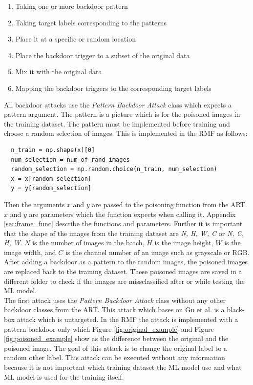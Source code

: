 \begin{enumerate}
  \item Taking one or more backdoor pattern
  \item Taking target labels corresponding to the patterns
  \item Place it at a specific or random location
  \item Place the backdoor trigger to a subset of the original data
  \item Mix it with the original data
  \item Mapping the backdoor triggers to the corresponding target labels
\end{enumerate}

All backdoor attacks use the \textit{Pattern Backdoor Attack} \cite{DBLP:journals/corr/abs-1708-06733} class which expects a pattern argument. The pattern is a picture which is for the poisoned images in the training dataset. The pattern must be implemented before training and choose a random selection of images. This is implemented in the RMF as follows:

\begin{lstlisting}
  n_train = np.shape(x)[0]
  num_selection = num_of_rand_images
  random_selection = np.random.choice(n_train, num_selection)
  x = x[random_selection]
  y = y[random_selection]
\end{lstlisting}

Then the arguments $x$ and $y$ are passed to the poisoning function from the ART. $x$ and $y$ are parameters which the function expects when calling it. Appendix \ref{sec:frame_func}
describe the functions and parameters. Further it is important that the shape of the images from the training dataset are \textit{N, H, W, C} or \textit{N, C, H, W}. $N$ is the number of
images in the batch, $H$ is the image height, $W$ is the image width, and $C$ is the channel number of an image such as grayscale or RGB. After adding a backdoor as a pattern to the
random images, the poisoned images are replaced back to the training dataset. These poisoned images are saved in a different folder to check if the images are missclassified after or while
testing the ML model.\\

The first attack uses the \textit{Pattern Backdoor Attack} class without any other backdoor classes from the ART. This attack which bases on Gu et al. \cite{DBLP:journals/corr/abs-1708-06733} is a black-box attack which is untargeted. In the RMF the attack is implemented with a pattern backdoor only which Figure \ref{fig:original_example} and Figure \ref{fig:poisoned_example} show as the
difference between the original and the poisoned image. The goal of this attack is to change the original label to a random other label. This attack can be executed without any
information because it is not important which training dataset the ML model use and what ML model is used for the training itself.

